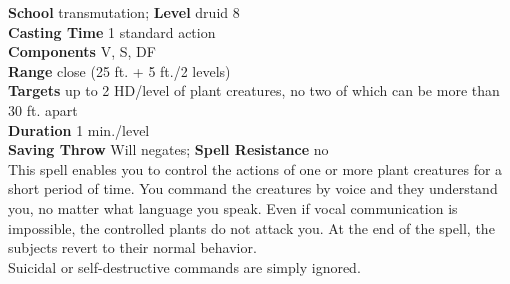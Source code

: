 \textbf{School} transmutation; \textbf{Level} druid 8\\
\textbf{Casting Time} 1 standard action\\
\textbf{Components} V, S, DF\\
\textbf{Range} close (25 ft. + 5 ft./2 levels)\\
\textbf{Targets} up to 2 HD/level of plant creatures, no two of which can be more than 30 ft. apart\\
\textbf{Duration} 1 min./level\\
\textbf{Saving Throw }Will negates; \textbf{Spell Resistance} no\\
This spell enables you to control the actions of one or more plant creatures for a short period of time. You command the creatures by voice and they understand you, no matter what language you speak. Even if vocal communication is impossible, the controlled plants do not attack you. At the end of the spell, the subjects revert to their normal behavior.\\
Suicidal or self-destructive commands are simply ignored.\\
